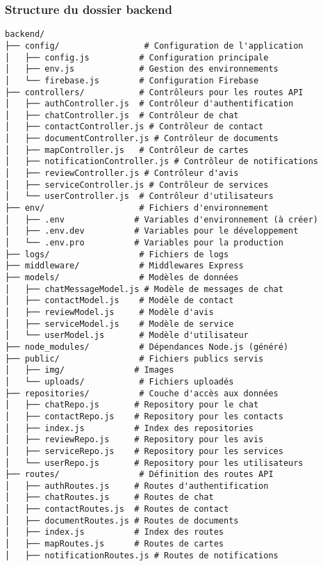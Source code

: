 \documentclass[12pt, a4paper]{article}
\begin{document}
\subsubsection{Structure du dossier backend}
\begin{lstlisting}
backend/
├── config/                 # Configuration de l'application
│   ├── config.js          # Configuration principale
│   ├── env.js             # Gestion des environnements
│   └── firebase.js        # Configuration Firebase
├── controllers/           # Contrôleurs pour les routes API
│   ├── authController.js  # Contrôleur d'authentification
│   ├── chatController.js  # Contrôleur de chat
│   ├── contactController.js # Contrôleur de contact
│   ├── documentController.js # Contrôleur de documents
│   ├── mapController.js   # Contrôleur de cartes
│   ├── notificationController.js # Contrôleur de notifications
│   ├── reviewController.js # Contrôleur d'avis
│   ├── serviceController.js # Contrôleur de services
│   └── userController.js  # Contrôleur d'utilisateurs
├── env/                   # Fichiers d'environnement
│   ├── .env              # Variables d'environnement (à créer)
│   ├── .env.dev          # Variables pour le développement
│   └── .env.pro          # Variables pour la production
├── logs/                  # Fichiers de logs
├── middleware/            # Middlewares Express
├── models/                # Modèles de données
│   ├── chatMessageModel.js # Modèle de messages de chat
│   ├── contactModel.js    # Modèle de contact
│   ├── reviewModel.js     # Modèle d'avis
│   ├── serviceModel.js    # Modèle de service
│   └── userModel.js       # Modèle d'utilisateur
├── node_modules/          # Dépendances Node.js (généré)
├── public/                # Fichiers publics servis
│   ├── img/              # Images
│   └── uploads/           # Fichiers uploadés
├── repositories/          # Couche d'accès aux données
│   ├── chatRepo.js       # Repository pour le chat
│   ├── contactRepo.js    # Repository pour les contacts
│   ├── index.js          # Index des repositories
│   ├── reviewRepo.js     # Repository pour les avis
│   ├── serviceRepo.js    # Repository pour les services
│   └── userRepo.js       # Repository pour les utilisateurs
├── routes/                # Définition des routes API
│   ├── authRoutes.js     # Routes d'authentification
│   ├── chatRoutes.js     # Routes de chat
│   ├── contactRoutes.js  # Routes de contact
│   ├── documentRoutes.js # Routes de documents
│   ├── index.js          # Index des routes
│   ├── mapRoutes.js      # Routes de cartes
│   ├── notificationRoutes.js # Routes de notifications

\end{lstlisting}
\end{document}
